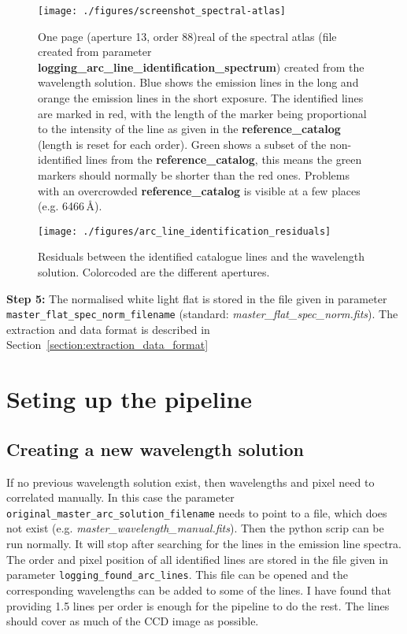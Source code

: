 \documentclass[10pt,a4paper]{article}
\begin{document}
\begin{figure} 
  \begin{center}
    \texttt{[image: ./figures/screenshot\_spectral-atlas]}
  \end{center} 
  \caption{One page (aperture 13, order 88)real  of the spectral atlas (file created from parameter \textbf{logging\_arc\_line\_identification\_spectrum}) created from the wavelength solution. Blue shows the emission lines in the long and orange the emission lines in the short exposure. The identified lines are marked in red, with the length of the marker being proportional to the intensity of the line as given in the \textbf{reference\_catalog} (length is reset for each order). Green shows a subset of the non-identified lines from the \textbf{reference\_catalog}, this means the green markers should normally be shorter than the red ones. Problems with an overcrowded \textbf{reference\_catalog} is visible at a few places (e.g. 6466\,\AA).
    \label{figure_arc_line_identification_spectrum}}
\end{figure}


\begin{figure} 
  \begin{center}
    \texttt{[image: ./figures/arc\_line\_identification\_residuals]}
  \end{center} 
  \caption{Residuals between the identified catalogue lines and the wavelength solution. Colorcoded are the different apertures.
    \label{figure_arc_line_identification_residuals}}
\end{figure}

\vspace{0.5em}\noindent \textbf{Step 5:} The normalised white light flat is stored in the file given in parameter \verb|master_flat_spec_norm_filename| (standard: \textit{master\_flat\_spec\_norm.fits}). The extraction and data format is described in Section~\ref{section:extraction_data_format}


\newpage
\section{Seting up the pipeline}

\subsection{Creating a new wavelength solution}
\label{section:create_new_wave_solution}
If no previous wavelength solution exist, then wavelengths and pixel need to correlated manually. In this case the parameter \verb|original_master_arc_solution_filename| needs to point to a file, which does not exist (e.g. \textit{master\_wavelength\_manual.fits}). Then the python scrip can be run normally. It will stop after searching for the lines in the emission line spectra. The order and pixel position of all identified lines are stored in the file given in parameter \verb|logging_found_arc_lines|. This file can be opened and the corresponding wavelengths can be added to some of the lines. I have found that providing 1.5 lines per order is enough for the pipeline to do the rest. The lines should cover as much of the CCD image as possible.
\end{document}
